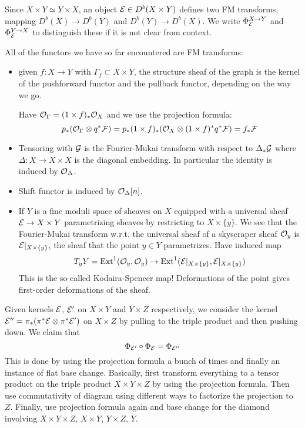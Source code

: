 \begin{remark}{}{}
    Since $X\times Y\simeq Y\times X$, an object $\mathcal{E}\in D^b(X\times Y)$
    defines two FM transforms; mapping $D^b(X)\to D^b(Y)$ and
    $D^b(Y)\to D^b(X)$. We write $\Phi^{X\to Y}_{\mathcal{E}}$ and $\Phi^{Y\to X}_{\mathcal{E}}$
    to distinguish these if it is not clear from context.
\end{remark}

All of the functors we have so far encountered are FM transforms:
\begin{itemize}
    \item given $f:X\to Y$ with $\Gamma_f\subset X\times Y$, the structure sheaf of the graph is the kernel of the pushforward functor and the pullback functor, depending on the way we go.

    Have $\mathcal{O}_\Gamma=(1\times f)_*\mathcal{O}_X$ and we use the projection formula:
    \begin{equation*}
        p_*(\mathcal{O}_\Gamma\otimes q^*\mathcal{F})
            = p_*(1\times f)_*(\mathcal{O}_X\otimes(1\times f)^*q^*\mathcal{F})
            = f_*\mathcal{F}
    \end{equation*}

    \item Tensoring with $\mathcal{G}$ is the Fourier-Mukai transform with respect to $\Delta_*\mathcal{G}$ where $\Delta:X\to X\times X$ is the diagonal embedding. In particular the identity is induced by $\mathcal{O}_\Delta$.

    \item Shift functor is induced by $\mathcal{O}_\Delta[n]$.

    \item If $Y$ is a fine moduli space of sheaves on $X$ equipped with a universal sheaf $\mathcal{E}\to X\times Y$ parametrizing sheaves by restricting to $X\times\{y\}$. We see that the Fourier-Mukai transform w.r.t. the universal sheaf of a skyscraper sheaf $\mathcal{O}_y$ is $\mathcal{E}|_{X\times\{y\}}$, the sheaf that the point $y\in Y$ parametrizes. Have induced map
        \begin{equation*}
            T_yY
                = \operatorname{Ext}^1(\mathcal{O}_{y},\mathcal{O}_{y})
                \to \operatorname{Ext}^1(\mathcal{E}|_{X\times\{y\}},\mathcal{E}|_{X\times\{y\}})
        \end{equation*}
        This is the so-called Kodaira-Spencer map! Deformations of the point gives first-order deformations of the sheaf.
\end{itemize}

Given kernels $\mathcal{E}$, $\mathcal{E}'$ on $X\times Y$ and $Y\times Z$ respectively, we consider the kernel $\mathcal{E}''=\pi_*(\pi^*\mathcal{E}\otimes\pi^*\mathcal{E}')$ on $X\times Z$ by pulling to the triple product and then pushing down. We claim that
\begin{equation*}
    \Phi_{\mathcal{E}'}\circ\Phi_{\mathcal{E}} = \Phi_{\mathcal{E}''}
\end{equation*}
This is done by using the projection formula a bunch of times and finally an instance of flat base change. Basically, first transform everything to a tensor product on the triple product $X\times Y \times Z$ by using the projection formula. Then use commutativity of diagram using different ways to factorize the projection to $Z$. Finally, use projection formula again and base change for the diamond involving $X\times Y \times Z$, $X\times Y$, $Y\times Z$, $Y$.

